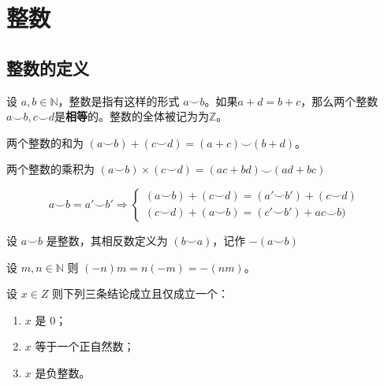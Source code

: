 \section{整数}

\subsection{整数的定义}

\begin{definition}[整数]
	设 $a,b\in \mathbb N$，整数是指有这样的形式 $a\smile b$。如果$a+d=b+c$，那么两个整数$a\smile b, c\smile d$是\textbf{相等}的。整数的全体被记为为$\mathbb Z$。
\end{definition}

\begin{definition}[加法]
	两个整数的和为 $(a\smile b) + (c\smile d) = (a+c)\smile (b+d)$。
\end{definition}

\begin{definition}[乘法]
	两个整数的乘积为 $(a\smile b) \times (c\smile d) = (ac+bd)\smile(ad+bc)$
\end{definition}



$$
a\smile b = a'\smile b' \Rightarrow 
\begin{cases}
	(a\smile b) + (c\smile d) = (a'\smile b') + (c\smile d)\\
	(c\smile d) + (a\smile b) = (c'\smile b') + ac\smile b)
\end{cases}
$$

\begin{definition}[负数]
	设 $a\smile b$ 是整数，其相反数定义为 $(b\smile a)$，记作 $-(a\smile b)$
\end{definition}

\begin{corollary}
	设 $m,n\in \mathbb N$ 则 $(-n)m = n(-m) = -(nm)$。
\end{corollary}

\begin{lemma}
	设 $x\in Z$ 则下列三条结论成立且仅成立一个：
	\begin{enumerate}
		\item $x$ 是 0；
		\item $x$ 等于一个正自然数；
		\item $x$ 是负整数。
	\end{enumerate}
\end{lemma}

